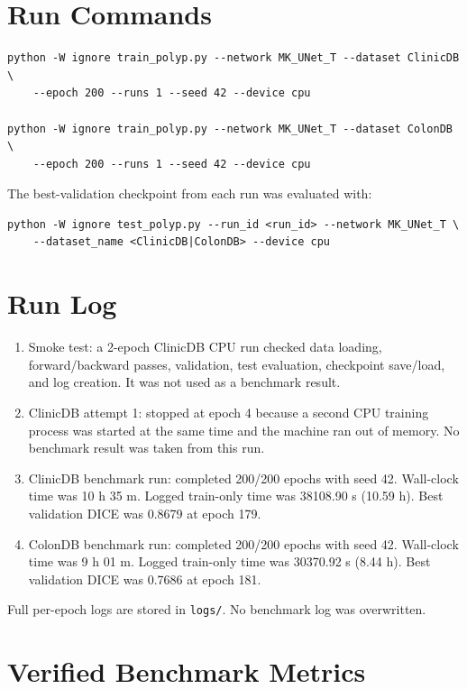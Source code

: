 \documentclass[10pt,a4paper]{article}
\begin{document}
\section{Run Commands}

\begin{verbatim}
python -W ignore train_polyp.py --network MK_UNet_T --dataset ClinicDB \
    --epoch 200 --runs 1 --seed 42 --device cpu

python -W ignore train_polyp.py --network MK_UNet_T --dataset ColonDB \
    --epoch 200 --runs 1 --seed 42 --device cpu
\end{verbatim}

The best-validation checkpoint from each run was evaluated with:

\begin{verbatim}
python -W ignore test_polyp.py --run_id <run_id> --network MK_UNet_T \
    --dataset_name <ClinicDB|ColonDB> --device cpu
\end{verbatim}

\section{Run Log}

\begin{enumerate}
\item Smoke test: a 2-epoch ClinicDB CPU run checked data loading, forward/backward passes, validation, test evaluation, checkpoint save/load, and log creation. It was not used as a benchmark result.
\item ClinicDB attempt 1: stopped at epoch 4 because a second CPU training process was started at the same time and the machine ran out of memory. No benchmark result was taken from this run.
\item ClinicDB benchmark run: completed 200/200 epochs with seed 42. Wall-clock time was 10 h 35 m. Logged train-only time was 38108.90 s (10.59 h). Best validation DICE was 0.8679 at epoch 179.
\item ColonDB benchmark run: completed 200/200 epochs with seed 42. Wall-clock time was 9 h 01 m. Logged train-only time was 30370.92 s (8.44 h). Best validation DICE was 0.7686 at epoch 181.
\end{enumerate}

Full per-epoch logs are stored in \texttt{logs/}. No benchmark log was overwritten.

\section{Verified Benchmark Metrics}
\end{document}
